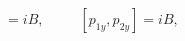 \begin{equation}
    [p_{1x},p_{2x}]=iB,\,\,\,\,\,\,\,\,\,\,\,\,\,\,\,[p_{1y},p_{2y}]=iB,
   \label{40}
    \end{equation}

